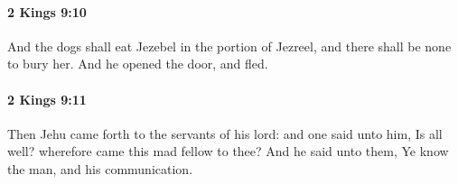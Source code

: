 		\paragraph{2 Kings 9:10} %
			\label{2KINGS-9-10}

			And the dogs shall eat Jezebel in the portion of Jezreel, and there shall be none to bury her. And he opened the door, and fled.


		\paragraph{2 Kings 9:11} %
			\label{2KINGS-9-11}

			Then Jehu came forth to the servants of his lord: and one said unto him, Is all well? wherefore came this mad fellow to thee? And he said unto them, Ye know the man, and his communication.


